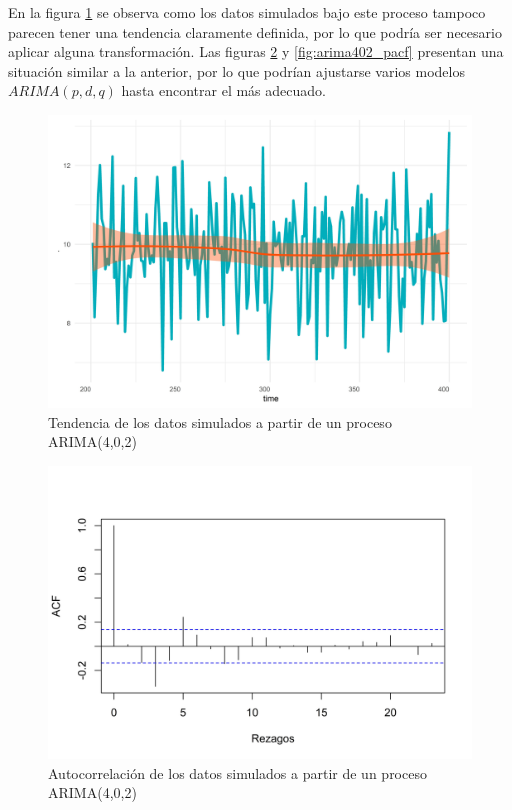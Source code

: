 \documentclass[
]{article}
\begin{document}
En la figura \ref{fig:arima402_comportamiento} se observa como los datos
simulados bajo este proceso tampoco parecen tener una tendencia
claramente definida, por lo que podría ser necesario aplicar alguna
transformación. Las figuras \ref{fig:arima402_acf} y
\ref{fig:arima402_pacf} presentan una situación similar a la anterior,
por lo que podrían ajustarse varios modelos \(ARIMA(p,d,q)\) hasta
encontrar el más adecuado.

\begin{figure}[H]
\includegraphics[width=1\linewidth,height=1\textheight]{Tesis_files/figure-latex/arima402_comportamiento-1} \caption{Tendencia de los datos simulados a partir de un proceso ARIMA(4,0,2)}\label{fig:arima402_comportamiento}
\end{figure}

\begin{figure}[H]
\includegraphics[width=1\linewidth,height=1\textheight]{Tesis_files/figure-latex/arima402_acf-1} \caption{Autocorrelación de los datos simulados a partir de un proceso ARIMA(4,0,2)}\label{fig:arima402_acf}
\end{figure}
\end{document}
